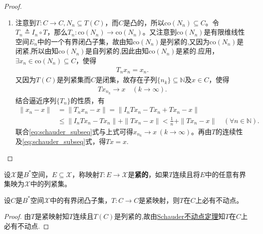\documentclass[../../main.tex]{subfiles}%
\begin{document}
\begin{proof}
\begin{enumerate}[(1)]
\begin{align*}
&= \sum_{\substack{y \in B(y_i, \frac{1}{n})}} \|y_i - y\| \lambda_i(y) + \sum_{\substack{y \notin B(y_i, \frac{1}{n})}} \|y_i - y\| \lambda_i(y) \\
&<\frac{1}{n}\sum_{i=1}^{r_n}{\lambda _i\left( y \right)}+0=\frac{1}{n}+0=\frac{1}{n}.
\end{align*}
\item 注意到$T: C \to C, N_n \subseteq T(C)$，而$C$是凸的，所以$\mathrm{co}(N_n) \subseteq C$。令$T_n \triangleq I_n \circ T$，那么$T_n: \mathrm{co}(N_n) \to \mathrm{co}(N_n)$。又注意到$\mathrm{co}(N_n)$是有限维线性空间$E_n$中的一个有界闭凸子集，故由知$\mathrm{co}(N_n)$是列紧的,又因为$\mathrm{co}(N_n)$是闭紧,所以由知$\mathrm{co}(N_n)$是自列紧的,因此由知$\mathrm{co}(N_n)$是紧的.应用，$\exists x_n \in \mathrm{co}(N_n) \subseteq C$，使得
\begin{align*}
T_n x_n = x_n. 
\end{align*}
又因为$T(C)$是列紧集而$C$是闭集，故存在子列$\{n_k\}\subseteq\mathbb{N}$及$x\in C$，使得
\begin{align}
Tx_{n_k}\to x\quad (k\to\infty).
\label{eq:schauder_subseq}
\end{align}
结合逼近序列$\{T_n\}$的性质，有
\begin{align*}
\|x_n - x\| &= \|T_nx_n - x\| 
= \|I_nTx_n - Tx_n + Tx_n - x\| \\
&\leqslant \|I_nTx_n - Tx_n\| + \|Tx_n - x\| 
< \frac{1}{n} + \|Tx_n - x\|\quad (\forall n\in\mathbb{N}).
\end{align*}
联合\eqref{eq:schauder_subseq}式与上式可得$x_{n_k}\to x\ (k\to\infty)$。再由$T$的连续性及\eqref{eq:schauder_subseq}式，得$Tx=x$.
\end{enumerate}
\end{proof}

\begin{definition}
设$\mathscr{X}$是$B^*$空间，$E\subseteq\mathscr{X}$，称映射$T:E\to\mathscr{X}$是\textbf{紧的}，如果$T$连续且将$E$中的任意有界集映为$\mathscr{X}$中的列紧集。
\end{definition}

\begin{corollary}\label{corollary:泛函分析--推论1.5.121}
设$C$是$B^*$空间$\mathscr{X}$中的有界闭凸子集，$T:C\to C$是紧映射，则$T$在$C$上必有不动点。
\end{corollary}
\begin{proof}
由$T$是紧映射知$T$连续且$T(C)$是列紧的,故由\hyperref[theorem:泛函分析---Schauder不动点定理]{Schauder不动点定理}知$T$在$C$上必有不动点.
\end{proof}
\end{document}
